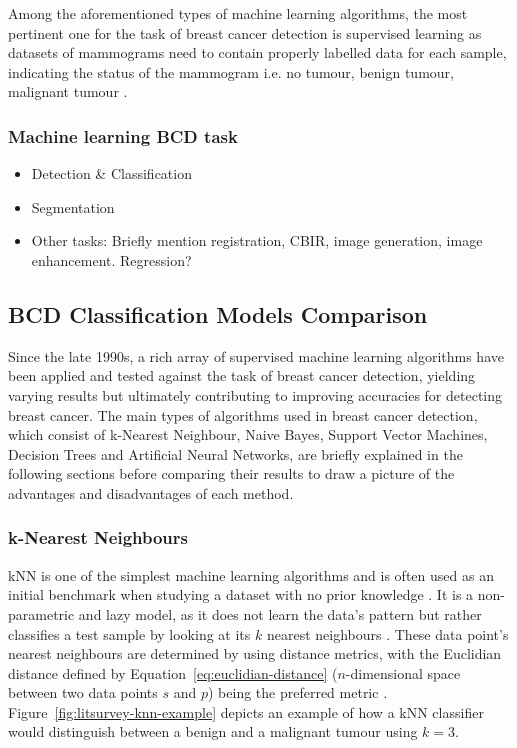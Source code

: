 Among the aforementioned types of machine learning algorithms, the most pertinent one for the task of breast cancer detection is supervised learning as datasets of mammograms need to contain properly labelled data for each sample, indicating the status of the mammogram i.e. no tumour, benign tumour, malignant tumour \cite{Shen2017}.

\subsubsection{Machine learning BCD task}

\begin{itemize}
    \item Detection \& Classification
    \item Segmentation
    \item Other tasks: Briefly mention registration, CBIR, image generation, image enhancement. Regression?
\end{itemize}

\subsection{BCD Classification Models Comparison}

Since the late 1990s, a rich array of supervised machine learning algorithms have been applied and tested against the task of breast cancer detection, yielding varying results but ultimately contributing to improving accuracies for detecting breast cancer. The main types of algorithms used in breast cancer detection, which consist of k-Nearest Neighbour, Naive Bayes, Support Vector Machines, Decision Trees and Artificial Neural Networks, are briefly explained in the following sections before comparing their results to draw a picture of the advantages and disadvantages of each method.

\subsubsection{k-Nearest Neighbours}
\label{sec:litreview-knn}

kNN is one of the simplest machine learning algorithms and is often used as an initial benchmark when studying a dataset with no prior knowledge \cite{peterson2009k}. It is a non-parametric and lazy model, as it does not learn the data's pattern but rather classifies a test sample by looking at its $k$ nearest neighbours \cite{Yue2018}. These data point's nearest neighbours are determined by using distance metrics, with the Euclidian distance defined by Equation~\ref{eq:euclidian-distance} ($n$-dimensional space between two data points $s$ and $p$) being the preferred metric \cite{peterson2009k}. Figure~\ref{fig:litsurvey-knn-example} depicts an example of how a kNN classifier would distinguish between a benign and a malignant tumour using $k=3$.

